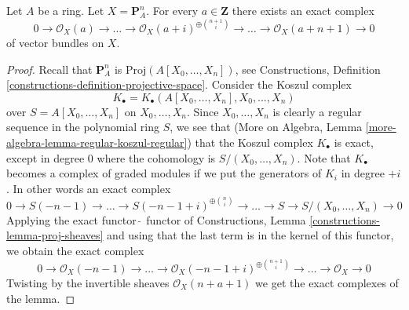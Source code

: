 \begin{lemma}
\label{lemma-construct-the-next-one}
Let $A$ be a ring. Let $X = \mathbf{P}^n_A$. For every $a \in \mathbf{Z}$
there exists an exact complex
$$
0 \to \mathcal{O}_X(a) \to \ldots
\to \mathcal{O}_X(a + i)^{\oplus {n + 1 \choose i}} \to
\ldots \to \mathcal{O}_X(a + n + 1) \to 0
$$
of vector bundles on $X$.
\end{lemma}

\begin{proof}
Recall that $\mathbf{P}^n_A$ is $\text{Proj}(A[X_0, \ldots, X_n])$, see
Constructions, Definition \ref{constructions-definition-projective-space}.
Consider the Koszul complex
$$
K_\bullet = K_\bullet(A[X_0, \ldots, X_n], X_0, \ldots, X_n)
$$
over $S = A[X_0, \ldots, X_n]$ on $X_0, \ldots, X_n$.
Since $X_0, \ldots, X_n$ is clearly a regular sequence in the
polynomial ring $S$, we see that
(More on Algebra, Lemma \ref{more-algebra-lemma-regular-koszul-regular})
that the Koszul complex $K_\bullet$ is exact, except in degree $0$
where the cohomology is $S/(X_0, \ldots, X_n)$.
Note that $K_\bullet$ becomes a complex of graded modules if we
put the generators of $K_i$ in degree $+i$. In other words an
exact complex
$$
0 \to S(-n - 1) \to \ldots \to S(-n - 1 + i)^{\oplus {n \choose i}} \to \ldots
\to S \to S/(X_0, \ldots, X_n) \to 0
$$
Applying the exact functor $\tilde{\ }$ functor of Constructions, 
Lemma \ref{constructions-lemma-proj-sheaves} and using that
the last term is in the kernel of this functor,
we obtain the exact complex
$$
0 \to \mathcal{O}_X(-n - 1) \to \ldots
\to \mathcal{O}_X(-n - 1 + i)^{\oplus {n + 1 \choose i}} \to
\ldots \to \mathcal{O}_X \to 0
$$
Twisting by the invertible sheaves $\mathcal{O}_X(n + a + 1)$
we get the exact complexes of the lemma.
\end{proof}
